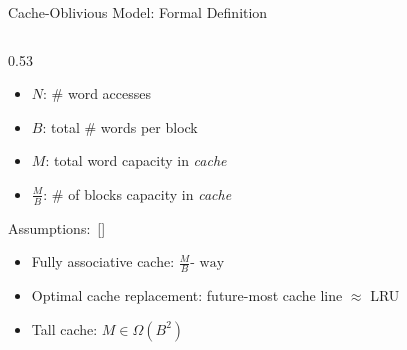 \documentclass[aspectratio=169, xcolor=dvipsnames]{beamer}
\begin{document}
\begin{frame}[fragile]{Cache-Oblivious Model: Formal Definition}
    
    \begin{columns}[T]
        \begin{column}{0.53\textwidth}
            \begin{itemize}
                \item $N$: \# word accesses
                \item $B$: total \# words per block
                \item $M$: total word capacity in \textit{cache}
                \item $\frac{M}{B}$: \# of blocks capacity in \textit{cache}
            \end{itemize}

            \medskip

            Assumptions:\ [\cite{demaine}]

            \begin{itemize}
                \item Fully associative cache: $\frac{M}{B}\text{- way}$
                \item Optimal cache replacement: future-most cache line $\approx$ LRU
                \item Tall cache: $M \in \Omega(B^2)$
            \end{itemize}

        \end{column}


\end{columns}
\end{frame}
\end{document}
